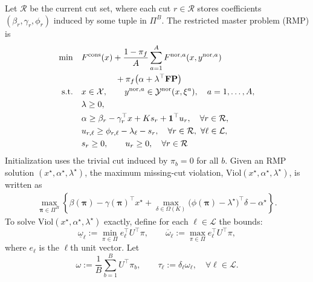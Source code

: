 \hspace*{0.7em}Let $\mathcal{R}$ be the current cut set, where each cut $r\in\mathcal{R}$ stores coefficients $(\beta_r,\gamma_r,\phi_r)$ induced by some tuple in $\Pi^B$. The restricted master problem (RMP) is
\begin{equation}
\label{eq:sg_rmp}
\begin{aligned}
\min\quad
&F^{\mathrm{cons}}(x)
+\frac{1-\pi_f}{A}\sum_{a=1}^A F^{{\rm nor},a}(x,y^{{\rm nor},a})\\
&\qquad\qquad+\pi_f\big(\alpha+\lambda^\top \mathbf{FP}\big)\\
\text{s.t.}\quad
&x\in \mathcal{X},\qquad y^{{\rm nor},a}\in \mathcal{Y}^{\mathrm{nor}}(x,\xi^a),\quad a=1,\dots,A,\\
&\lambda\ge 0,\\
&\alpha\ge \beta_r-\gamma_r^\top x+Ks_r+\mathbf{1}^\top u_r,\quad \forall r\in\mathcal{R},\\
&u_{r,\ell}\ge \phi_{r,\ell}-\lambda_{\ell}-s_r,\quad \forall r\in\mathcal{R},\ \forall \ell\in\mathcal{L},\\
&s_r\ge 0,\qquad u_r\ge 0,\quad \forall r\in\mathcal{R}
\end{aligned}
\end{equation}
\hspace*{0.7em}Initialization uses the trivial cut induced by $\pi_b=0$ for all $b$.
Given an RMP solution $(x^{\star},\alpha^{\star},\lambda^{\star})$, the maximum missing-cut violation, $\mathrm{Viol}(x^{\star},\alpha^{\star},\lambda^{\star})$, is written as
\begin{equation*}
\begin{aligned}
\max_{\boldsymbol{\pi}\in\Pi^B}
\left\{\beta(\boldsymbol{\pi})-\gamma(\boldsymbol{\pi})^\top x^{\star}
+\max_{\delta\in\Omega(K)}\big(\phi(\boldsymbol{\pi})-\lambda^{\star}\big)^\top\delta
-\alpha^{\star}\right\}.
\end{aligned}
\end{equation*}
\hspace*{0.7em}To solve $\mathrm{Viol}(x^{\star},\alpha^{\star},\lambda^{\star})$ exactly, define for each $\ell\in\mathcal{L}$ the bounds:
\begin{equation}
\label{eq:sg_bounds_main}
\underline{\omega}_{\ell}:=\min_{\pi\in\Pi} e_{\ell}^\top U^\top\pi,
\qquad
\overline{\omega}_{\ell}:=\max_{\pi\in\Pi} e_{\ell}^\top U^\top\pi,
\end{equation}
where $e_{\ell}$ is the $\ell$th unit vector. Let
\[
\omega:=\frac{1}{B}\sum_{b=1}^B U^\top\pi_b,
\qquad
\tau_{\ell}:=\delta_{\ell}\omega_{\ell},\quad \forall \ell\in\mathcal{L}.
\]
